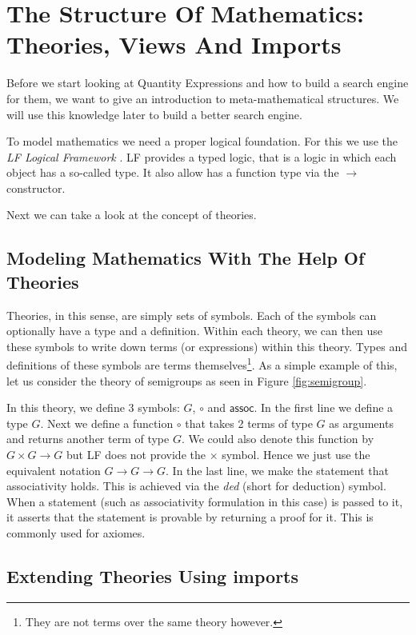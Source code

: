 \section{The Structure Of Mathematics: Theories, Views And Imports}
\label{sec:mathoverview}

Before we start looking at Quantity Expressions and how to build a search engine for them, we want to give an introduction to meta-mathematical structures. We will use this knowledge later to build a better search engine.

To model mathematics we need a proper logical foundation. For this we use the \textit{LF Logical Framework} \cite{hhp93lf}. LF provides a typed logic, that is a logic in which each object has a so-called type. It also allow has a function type via the $\rightarrow$ constructor.

Next we can take a look at the concept of theories.

\subsection{Modeling Mathematics With The Help Of Theories}

Theories, in this sense, are simply sets of symbols. Each of the symbols can optionally have a type and a definition. Within each theory, we can then use these symbols to write down terms (or expressions) within this theory. Types and definitions of these symbols are terms themselves\footnote{They are not terms over the same theory however. }. As a simple example of this, let us consider the theory of semigroups as seen in Figure \ref{fig:semigroup}.



In this theory, we define 3 symbols: $G$, $\circ$ and $\scriptstyle \mathsf{assoc}$. In the first line we define a type $G$. Next we define a function $\circ$ that takes 2 terms of type $G$ as arguments and returns another term of type $G$. We could also denote this function by $G \times G \rightarrow G$ but LF does not provide the $\times$ symbol. Hence we just use the equivalent notation $G \rightarrow G \rightarrow G$. In the last line, we make the statement that associativity holds. This is achieved via the \textit{ded} (short for deduction) symbol. When a statement (such as associativity formulation in this case) is passed to it, it asserts that the statement is provable by returning a proof for it. This is commonly used for axiomes.

\subsection{Extending Theories Using imports}

